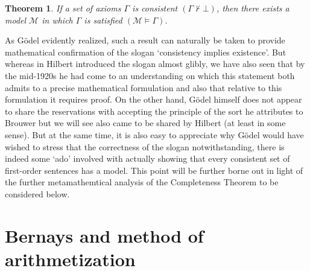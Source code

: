 \documentclass[11pt,fleqn,leqno]{article}
\newtheorem{theorem}{Theorem}[section]
\def\proves{\vdash}
\begin{document}
\begin{theorem} \label{ct}
If a set of axioms $\Gamma$ is consistent $(\Gamma \not\proves \bot)$, then there exists a model $\mathcal{M}$ in which $\Gamma$ is satisfied $(\mathcal{M} \models \Gamma)$.   \label{compthm}
\end{theorem}
As G\"odel evidently realized, such a result can naturally be taken to provide mathematical confirmation of the slogan `consistency implies existence'.   But whereas in \citeyearpar{Hilbert1900} Hilbert introduced the slogan almost glibly, we have also seen that by the mid-1920s he had come to an understanding on which this statement both admits to a precise mathematical formulation and also that relative to this formulation it requires proof.  On the other hand, G\"odel himself does not appear to  share the reservations with accepting the principle of the sort he attributes to Brouwer but we will see also came to be shared by Hilbert (at least in some sense).   But at the same time, it is also easy to appreciate why G\"odel would have wished to stress that the correctness of the slogan notwithstanding, there is indeed some `ado' involved with actually showing that every consistent set of first-order sentences has a model.    This point will be further borne out in light of the further metamathemtical analysis of the Completeness Theorem to be considered below.

\section{Bernays and method of arithmetization}
\end{document}
